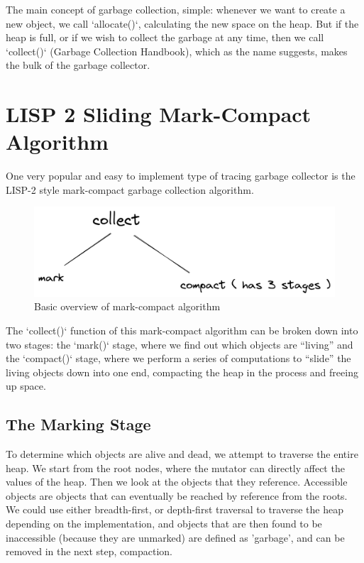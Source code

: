 \documentclass[index]{subfiles}
\begin{document}
The main concept of garbage collection, simple: whenever we want to create a new object, we call `allocate()`, calculating the new space on the heap. But if the heap is full, or if we wish to collect the garbage at any time, then we call `collect()` (Garbage Collection Handbook), which as the name suggests, makes the bulk of the garbage collector.

\section{LISP 2 Sliding Mark-Compact Algorithm}

One very popular and easy to implement type of tracing garbage collector is the LISP-2 style mark-compact garbage collection algorithm.

\begin{figure}[H]
    \centering
    \includegraphics[scale=0.3]{pics/mark-compact-overview.png}
    \caption{Basic overview of mark-compact algorithm}
\end{figure}

The `collect()` function of this mark-compact algorithm can be broken down into two stages: the `mark()` stage, where we find out which objects are ``living'' and the `compact()` stage, where we perform a series of computations to ``slide'' the living objects down into one end, compacting the heap in the process and freeing up space.

\subsection{The Marking Stage}

To determine which objects are alive and dead, we attempt to traverse the entire heap. We start from the root nodes, where the mutator can directly affect the values of the heap. Then we look at the objects that they reference. Accessible objects are objects that can eventually be reached by reference from the roots. We could use either breadth-first, or depth-first traversal to traverse the heap depending on the implementation, and  objects that are then found to be inaccessible (because they are unmarked) are defined as 'garbage', and can be removed in the next step, compaction.
\end{document}
